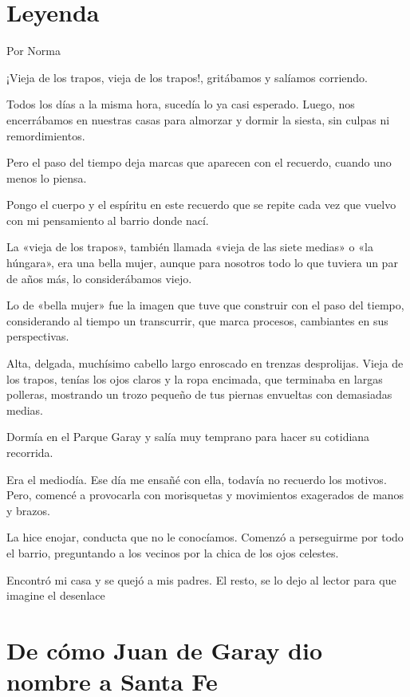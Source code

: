 \documentclass[11pt,twoside,openright,a5paper]{book}
\begin{document}
\section*{Leyenda}
                                                                                                      \begin{flushright}Por Norma\end{flushright}

¡Vieja de los trapos, vieja de los trapos!, gritábamos y salíamos corriendo.

Todos los días a la misma hora, sucedía lo ya casi esperado. Luego, nos encerrábamos en nuestras casas para almorzar y dormir la siesta, sin culpas ni remordimientos.

Pero el paso del tiempo deja marcas que aparecen con el recuerdo, cuando uno menos lo piensa.

Pongo el cuerpo y el espíritu en este recuerdo que se repite cada vez que vuelvo con mi pensamiento al barrio donde nací.

La «vieja de los trapos», también llamada «vieja de las siete medias» o «la húngara», era una bella mujer, aunque para nosotros todo lo que tuviera un par de años más, lo considerábamos viejo.

Lo de «bella  mujer» fue la imagen que tuve que construir con el paso del tiempo, considerando al tiempo un transcurrir, que marca procesos, cambiantes en sus perspectivas.

Alta, delgada, muchísimo cabello largo enroscado en trenzas desprolijas. Vieja de los trapos, tenías los ojos claros y la ropa encimada, que terminaba en largas polleras, mostrando un trozo pequeño de tus piernas envueltas con demasiadas medias.

Dormía en el Parque Garay y salía muy temprano para hacer su cotidiana recorrida.

Era el mediodía. Ese día me ensañé con ella, todavía no recuerdo los motivos. Pero, comencé a provocarla con morisquetas y movimientos exagerados de manos y brazos.

La hice enojar, conducta que no le conocíamos. Comenzó a perseguirme por todo el barrio, preguntando a los vecinos por la chica de los ojos celestes.

Encontró mi casa y se quejó a mis padres. El resto, se lo dejo al lector para que imagine el desenlace

\section*{De cómo Juan de Garay dio nombre a Santa Fe}
\end{document}

